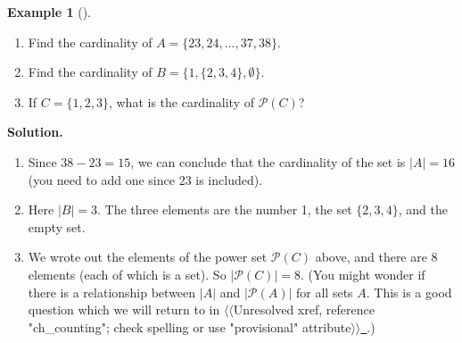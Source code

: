 \documentclass[10pt,]{book}
\theoremstyle{plain}
\theoremstyle{definition}
\newtheorem{example}[theorem]{Example}
\theoremstyle{definition}
\numberwithin{equation}{chapter}
\newcommand{\pow}{\mathcal P}
\newcommand{\card}[1]{\left| #1 \right|}
\begin{document}
\begin{example}[]\label{example-13}
\hypertarget{p-419}{}%
\leavevmode%
\begin{enumerate}
\item\hypertarget{li-284}{}\hypertarget{p-420}{}%
Find the cardinality of \(A = \{23, 24, \ldots, 37, 38\}\).%
\item\hypertarget{li-285}{}\hypertarget{p-421}{}%
Find the cardinality of \(B = \{1, \{2, 3, 4\}, \emptyset\}\).%
\item\hypertarget{li-286}{}\hypertarget{p-422}{}%
If \(C = \{1,2,3\}\), what is the cardinality of \(\pow(C)\)?%
\end{enumerate}
%
\par\smallskip%
\noindent\textbf{Solution.}\hypertarget{solution-25}{}\quad%
\hypertarget{p-423}{}%
\leavevmode%
\begin{enumerate}
\item\hypertarget{li-287}{}\hypertarget{p-424}{}%
Since \(38 - 23 = 15\), we can conclude that the cardinality of the set is \(|A| = 16\) (you need to add one since 23 is included).%
\item\hypertarget{li-288}{}\hypertarget{p-425}{}%
Here \(|B| = 3\). The three elements are the number 1, the set \(\{2,3,4\}\), and the empty set.%
\item\hypertarget{li-289}{}\hypertarget{p-426}{}%
We wrote out the elements of the power set \(\pow(C)\) above, and there are 8 elements (each of which is a set). So \(\card{\pow(C)} = 8\).  (You might wonder if there is a relationship between \(\card{A}\) and \(\card{\pow(A)}\) for all sets \(A\).  This is a good question which we will return to in {$\langle\langle$Unresolved xref, reference "ch\_counting"; check spelling or use "provisional" attribute$\rangle\rangle$}\hyperlink{}{~}.)%
\end{enumerate}
%
\end{example}
\typeout{************************************************}
\typeout{************************************************}
\end{document}
